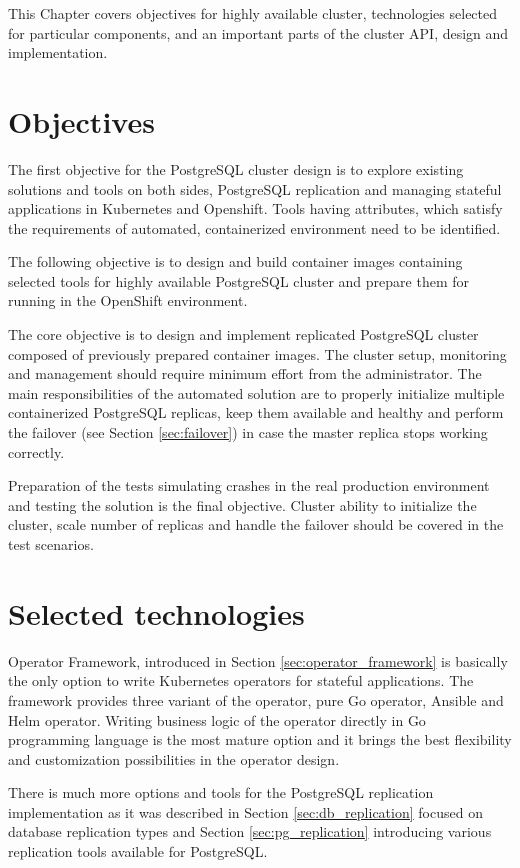 \documentclass[
  digital, %
  twoside, %
  table,   %
  lof,     %
  lot,     %
]{fithesis3}
\begin{document}
This Chapter covers objectives for highly available cluster, technologies selected for particular components, and an important parts of the cluster API, design and implementation.

\section{Objectives}
The first objective for the PostgreSQL cluster design is to explore existing solutions and tools on both sides, PostgreSQL replication and managing stateful applications in Kubernetes and Openshift. Tools having attributes, which satisfy the requirements of automated, containerized environment need to be identified.

The following objective is to design and build container images containing selected tools for highly available PostgreSQL cluster and prepare them for running in the OpenShift environment.

The core objective is to design and implement replicated PostgreSQL cluster composed of previously prepared container images. The cluster setup, monitoring and management should require minimum effort from the administrator. The main responsibilities of the automated solution are to properly initialize multiple containerized PostgreSQL replicas, keep them available and healthy and perform the failover (see Section \ref{sec:failover}) in case the master replica stops working correctly.

Preparation of the tests simulating crashes in the real production environment and testing the solution is the final objective. Cluster ability to initialize the cluster, scale number of replicas and handle the failover should be covered in the test scenarios.

\section{Selected technologies} \label{sec:selected_technologies}
Operator Framework, introduced in Section \ref{sec:operator_framework} is basically the only option to write Kubernetes operators for stateful applications. The framework provides three variant of the operator, pure Go operator, Ansible and Helm operator. Writing business logic of the operator directly in Go programming language is the most mature option and it brings the best flexibility and customization possibilities in the operator design.

There is much more options and tools for the PostgreSQL replication implementation as it was described in Section \ref{sec:db_replication} focused on database replication types and Section \ref{sec:pg_replication} introducing various replication tools available for PostgreSQL.
\end{document}
